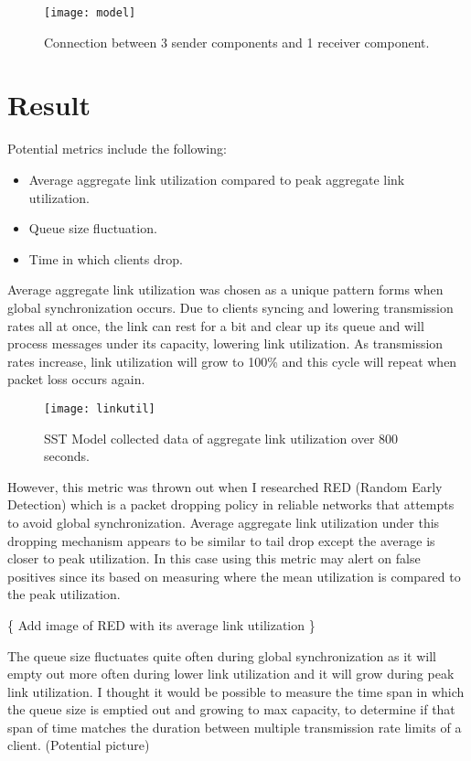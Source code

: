 \documentclass{article}
\begin{document}
\begin{figure}[H]
	\centering
	\texttt{[image: model]}
	\caption{Connection between 3 sender components and 1 receiver component.}
\end{figure}

\section{Result} %

Potential metrics include the following:
	\begin{itemize}
		\item Average aggregate link utilization compared to peak aggregate link utilization.
		\item Queue size fluctuation.
		\item Time in which clients drop.
	\end{itemize}

	Average aggregate link utilization was chosen as a unique pattern forms when global synchronization occurs. Due to clients syncing and lowering transmission rates all at once, the link can rest for a bit and clear up its queue and will process messages under its capacity, lowering link utilization. As transmission rates increase, link utilization will grow to 100\% and this cycle will repeat when packet loss occurs again.\newline
	
	\begin{figure}[H]
	\centering
	\texttt{[image: linkutil]}
	\caption{SST Model collected data of aggregate link utilization over 800 seconds.}
	\end{figure}
	
	\indent However, this metric was thrown out when I researched RED (Random Early Detection) which is a packet dropping policy in reliable networks that attempts to avoid global synchronization. Average aggregate link utilization under this dropping mechanism appears to be similar to tail drop except the average is closer to peak utilization. In this case using this metric may alert on false positives since its based on measuring where the mean utilization is compared to the peak utilization. \newline
	
																			\{ Add image of RED with its average link utilization \}\newline
	
	The queue size fluctuates quite often during global synchronization as it will empty out more often during lower link utilization and it will grow during peak link utilization. I thought it would be possible to measure the time span in which the queue size is emptied out and growing to max capacity, to determine if that span of time matches the duration between multiple transmission rate limits of a client.\newline
	(Potential picture)\newline
	
\end{document}
